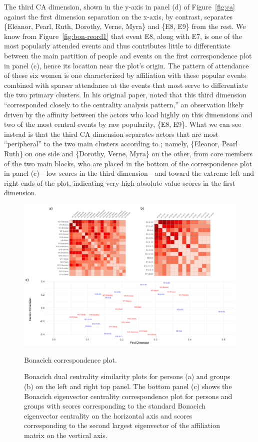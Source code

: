 \documentclass[a4paper,fleqn]{cas-sc}
\begin{document}
The third CA dimension, shown in the y-axis in panel (d) of Figure~\ref{fig:ca} against the first dimension separation on the x-axis, by contrast, separates \{Eleanor, Pearl, Ruth, Dorothy, Verne, Myra\} and \{E8, E9\} from the rest. We know from Figure~\ref{fig:bon-reord1} that event E8, along with E7, is one of the most popularly attended events and thus contributes little to differentiate between the main partition of people and events on the first correspondence plot in panel (c), hence its location near the plot's origin. The pattern of attendance of these six women is one characterized by affiliation with these popular events combined with sparser attendance at the events that most serve to differentiate the two primary clusters. In his original paper, \citet[164]{bonacich1991simultaneous} noted that this third dimension ``corresponded closely to the centrality analysis pattern,'' an observation likely driven by the affinity between the actors who load highly on this dimensions and two of the most central events by raw popularity, \{E8, E9\}. What we can see instead is that the third CA dimension separates actors that are most ``peripheral'' to the two main clusters according to \citet{freeman2003finding}; namely, \{Eleanor, Pearl Ruth\} on one side and \{Dorothy, Verne, Myra\} on the other, from core members of the two main blocks, who are placed in the bottom of the correspondence plot in panel (c)---low scores in the third dimension---and toward the extreme left and right ends of the plot, indicating very high absolute value scores in the first dimension. 

\begin{figure}
    \captionsetup[subfigure]{font=footnotesize,labelfont=footnotesize}
    \centering
        \includegraphics[width=1.0\textwidth]{Plots/bon-corr-plot.png}
            \caption{Bonacich correspondence plot.}
            \label{fig:bon-corr}
    \caption{Bonacich dual centrality similarity plots for persons (a) and groups (b) on the left and right top panel. The bottom panel (c) shows the Bonacich eigenvector centrality correspondence plot for persons and groups with scores corresponding to the standard Bonacich eigenvector centrality on the horizontal axis and scores corresponding to the second largest eigenvector of the affiliation matrix on the vertical axis.}
    \label{fig:bon-sim}
\end{figure}
\end{document}
